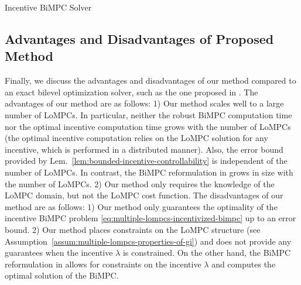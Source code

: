 \begin{algorithm}[tp]
\small
\DontPrintSemicolon
\caption{Incentive BiMPC Solver}\label{alg:incentivized-bimpc-solution}
\end{algorithm}


\subsection{Advantages and Disadvantages of Proposed Method}
\label{subsec:advantages-and-disadvantages-of-proposed-method}

Finally, we discuss the advantages and disadvantages of our method compared to an exact bilevel optimization solver, such as the one proposed in \cite{mintz2018control}.
The advantages of our method are as follows:
1) Our method scales well to a large number of LoMPCs.
In particular, neither the robust BiMPC computation time nor the optimal incentive computation time grows with the number of LoMPCs (the optimal incentive computation relies on the LoMPC solution for any incentive, which is performed in a distributed manner).
Also, the error bound provided by Lem.~\ref{lem:bounded-incentive-controllability} is independent of the number of LoMPCs.
In contrast, the BiMPC reformulation in \cite{mintz2018control} grows in size with the number of LoMPCs.
2) Our method only requires the knowledge of the LoMPC domain, but not the LoMPC cost function.
The disadvantages of our method are as follows:
1) Our method only guarantees the optimality of the incentive BiMPC problem \eqref{eq:multiple-lompcs-incentivized-bimpc} up to an error bound.
2) Our method places constraints on the LoMPC structure (see Assumption~\ref{assum:multiple-lompcs-properties-of-gi}) and does not provide any guarantees when the incentive $\lambda$ is constrained.
On the other hand, the BiMPC reformulation in \cite{mintz2018control} allows for constraints on the incentive $\lambda$ and computes the optimal solution of the BiMPC.


